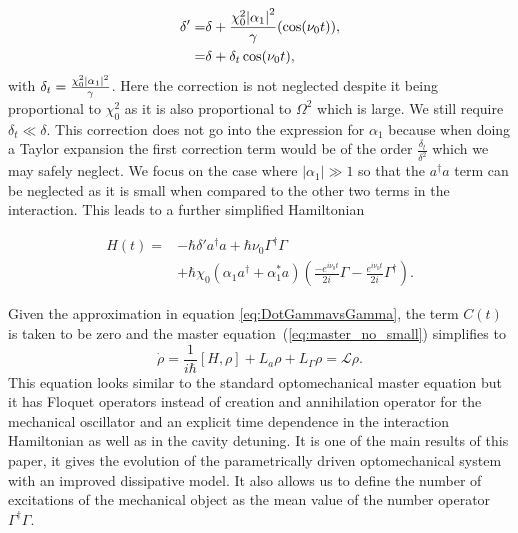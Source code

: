 \documentclass[reprint, amsmath,amssymb, aps,pra]{revtex4-1}
\begin{document}
\begin{align}
\delta' =& \delta +\frac{\chi_0^2 \abs{\alpha_1}^2}{\gamma} (\cos(\nu_0 t)), \nonumber\\
=& \delta + \delta_t\cos(\nu_0 t),
\end{align} with $\delta_t=\frac{\chi_0^2 \abs{\alpha_1}^2}{\gamma}$.  Here the correction is not neglected despite it being proportional to $\chi_0^2$ as it is also proportional to $\Omega^2$ which is large. We still require $\delta_t\ll\delta$. This correction does not go into the expression for $\alpha_1$ because when doing a Taylor expansion the first correction term would be of the order $\frac{\delta_t}{\delta^2}$ which we may safely neglect.
We focus on the case where $|\alpha_1| \gg 1$
\cite{BarberisLC} so that the $a^\dagger a$ term can be neglected as
it is small when compared to the other two terms in the interaction.
This leads to a further simplified Hamiltonian

\begin{align} \label{LCHamiltonian}
H(t) =& -\hbar \delta' a^{\dagger}a +\hbar\nu_0\Gamma^{\dagger}\Gamma \\
&+\hbar \chi_0(\alpha_1 a^{\dagger}+\alpha^*_1 a)(\frac{-e^{i\nu_0 t}}{2i}\Gamma-\frac{
e^{i\nu_0 t}}{2i} \nonumber\Gamma^{\dagger}).
\end{align} 

 Given the approximation in equation
\eqref{eq:DotGammavsGamma}, the term $C(t)$ is taken to be zero and the master
equation~(\ref{eq:master_no_small}) simplifies to
\begin{equation}\label{LCMasterEq}
\dot{\rho} = \frac{1}{i\hbar}[H,\rho] +L_a\rho + L_\Gamma \rho = \mathcal{L}\rho.
\end{equation}
This equation looks similar to the standard optomechanical master
equation but it has Floquet operators instead of creation and
annihilation operator for the mechanical oscillator and an explicit
time dependence in the interaction Hamiltonian as well as in the
cavity detuning. It is one of the main results of this paper, it gives
the evolution of the parametrically driven optomechanical system with
an improved dissipative model. It also allows us to define the number
of excitations of the mechanical object as the mean value of the
number operator $\Gamma^\dagger\Gamma$.
\end{document}
